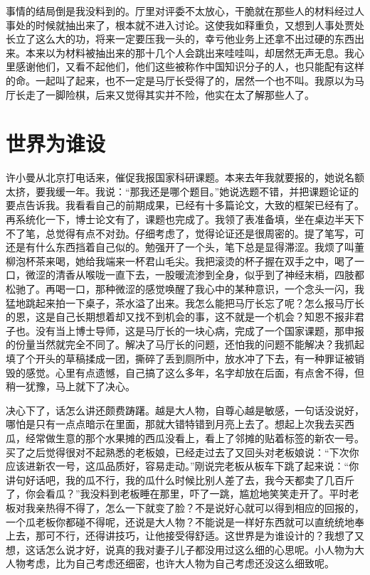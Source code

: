 \documentclass[12pt,oneside]{book}
\begin{document}
事情的结局倒是我没料到的。厅里对评委不太放心，干脆就在那些人的材料经过人事处的时候就抽出来了，根本就不进入讨论。这使我如释重负，又想到人事处贾处长立了这么大的功，将来一定要压我一头的，幸亏他业务上还拿不出过硬的东西出来。本来以为材料被抽出来的那十几个人会跳出来哇哇叫，却居然无声无息。我心里感谢他们，又看不起他们，他们这些被称作中国知识分子的人，也只能配有这样的命。一起叫了起来，也不一定是马厅长受得了的，居然一个也不叫。我原以为马厅长走了一脚险棋，后来又觉得其实并不险，他实在太了解那些人了。


\chapter{世界为谁设}

许小曼从北京打电话来，催促我报国家科研课题。本来去年我就要报的，她说名额太挤，要我缓一年。我说：``那我还是哪个题目。''她说选题不错，并把课题论证的要点告诉我。我看看自己的前期成果，已经有十多篇论文，大致的框架已经有了。再系统化一下，博士论文有了，课题也完成了。我领了表准备填，坐在桌边半天下不了笔，总觉得有点不对劲。仔细考虑了，觉得论证还是很周密的。提了笔写，可还是有什么东西挡着自己似的。勉强开了一个头，笔下总是显得滞涩。我烦了叫董柳泡杯茶来喝，她给我端来一杯君山毛尖。我把滚烫的杯子握在双手之中，喝了一口，微涩的清香从喉咙一直下去，一股暖流渗到全身，似乎到了神经末梢，四肢都松驰了。再喝一口，那种微涩的感觉唤醒了我心中的某种意识，一个念头一闪，我猛地跳起来拍一下桌子，茶水溢了出来。我怎么能把马厅长忘了呢？怎么报马厅长的恩，这是自己长期想着却又找不到机会的事，这不就是一个机会？知恩不报非君子也。没有当上博士导师，这是马厅长的一块心病，完成了一个国家课题，那申报的份量当然就完全不同了。解决了马厅长的问题，还怕我的问题不能解决？我抓起填了个开头的草稿揉成一团，撕碎了丢到厕所中，放水冲了下去，有一种罪证被销毁的感觉。心里有点遗憾，自己搞了这么多年，名字却放在后面，有点舍不得，但稍一犹豫，马上就下了决心。

决心下了，话怎么讲还颇费踌躇。越是大人物，自尊心越是敏感，一句话没说好，哪怕是只有一点点暗示在里面，那就大错特错到月亮上去了。想起上次我去买西瓜，经常做生意的那个水果摊的西瓜没看上，看上了邻摊的贴着标签的新农一号。买了之后觉得很对不起熟悉的老板娘，已经走过去了又回头对老板娘说：``下次你应该进新农一号，这瓜品质好，容易走动。''刚说完老板从板车下跳了起来说：``你讲句好话吧，我的瓜不行，我的瓜什么时候比别人差了去，我今天都卖了几百斤了，你会看瓜？''我没料到老板睡在那里，吓了一跳，尴尬地笑笑走开了。平时老板对我亲热得不得了，怎么一下就变了脸？不是说好心就可以得到相应的回报的，一个瓜老板你都碰不得呢，还说是大人物？不能说是一样好东西就可以直统统地奉上去，那可不行，还得讲技巧，让他接受得舒适。这世界是为谁设计的？我想了又想，这话怎么说才好，说真的我对妻子儿子都没用过这么细的心思呢。小人物为大人物考虑，比为自己考虑还细密，也许大人物为自己考虑还没这么细致呢。
\end{document}
